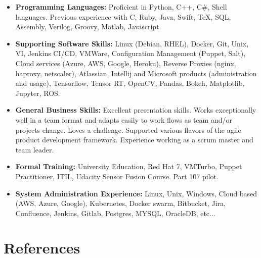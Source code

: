\documentclass[11pt,a4paper,sans]{moderncv}        %
\begin{document}
\begin{itemize}

\item \textbf{Programming Languages:} Proficient in Python, C++, C\#, Shell languages. Previous experience with C, Ruby, Java, Swift, TeX, SQL, Assembly, Verilog, Groovy, Matlab, Javascript.

\vspace{3pt}

\item \textbf{Supporting Software Skills:} Linux (Debian, RHEL), Docker, Git, Unix, VI, Jenkins CI/CD, VMWare, Configuration Management (Puppet, Salt), Cloud services (Azure, AWS, Google, Heroku), Reverse Proxies (nginx, haproxy, netscaler), Atlassian, Intellij and Microsoft products (administration and usage), Tensorflow, Tensor RT, OpenCV, Pandas, Bokeh, Matplotlib, Jupyter, ROS.

\vspace{3pt}

\item \textbf{General Business Skills:} Excellent presentation skills. Works exceptionally well in a team format and adapts easily to work flows as team and/or projects change. Loves a challenge. Supported various flavors of the agile product development framework. Experience working as a scrum master and team leader.

\vspace{3pt}

\item \textbf{Formal Training:} University Education, Red Hat 7, VMTurbo, Puppet Practitioner, ITIL, Udacity Sensor Fusion Course. Part 107 pilot.

\vspace{3pt}

\item \textbf{System Administration Experience:} Linux, Unix, Windows, Cloud based (AWS, Azure, Google), Kubernetes, Docker swarm, Bitbucket, Jira, Confluence, Jenkins, Gitlab, Postgres, MYSQL, OracleDB, etc...

\end{itemize}

\section{References}

\vspace{3pt}
 
\end{document}
